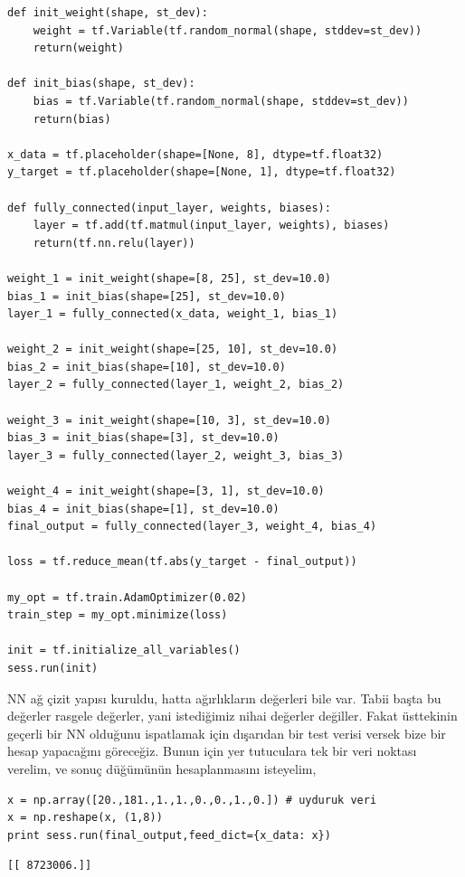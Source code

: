 \documentclass[12pt,fleqn]{article}\usepackage{../../common}
\begin{document}
\begin{verbatim}
def init_weight(shape, st_dev):
    weight = tf.Variable(tf.random_normal(shape, stddev=st_dev))
    return(weight)
    
def init_bias(shape, st_dev):
    bias = tf.Variable(tf.random_normal(shape, stddev=st_dev))
    return(bias)
    
x_data = tf.placeholder(shape=[None, 8], dtype=tf.float32)
y_target = tf.placeholder(shape=[None, 1], dtype=tf.float32)

def fully_connected(input_layer, weights, biases):
    layer = tf.add(tf.matmul(input_layer, weights), biases)
    return(tf.nn.relu(layer))

weight_1 = init_weight(shape=[8, 25], st_dev=10.0)
bias_1 = init_bias(shape=[25], st_dev=10.0)
layer_1 = fully_connected(x_data, weight_1, bias_1)

weight_2 = init_weight(shape=[25, 10], st_dev=10.0)
bias_2 = init_bias(shape=[10], st_dev=10.0)
layer_2 = fully_connected(layer_1, weight_2, bias_2)

weight_3 = init_weight(shape=[10, 3], st_dev=10.0)
bias_3 = init_bias(shape=[3], st_dev=10.0)
layer_3 = fully_connected(layer_2, weight_3, bias_3)

weight_4 = init_weight(shape=[3, 1], st_dev=10.0)
bias_4 = init_bias(shape=[1], st_dev=10.0)
final_output = fully_connected(layer_3, weight_4, bias_4)

loss = tf.reduce_mean(tf.abs(y_target - final_output))

my_opt = tf.train.AdamOptimizer(0.02)
train_step = my_opt.minimize(loss)

init = tf.initialize_all_variables()
sess.run(init)
\end{verbatim}

NN ağ çizit yapısı kuruldu, hatta ağırlıkların değerleri bile var. Tabii
başta bu değerler rasgele değerler, yani istediğimiz nihai değerler
değiller. Fakat üsttekinin geçerli bir NN olduğunu ispatlamak için
dışarıdan bir test verisi versek bize bir hesap yapacağını göreceğiz. Bunun
için yer tutuculara tek bir veri noktası verelim, ve sonuç düğümünün
hesaplanmasını isteyelim,

\begin{verbatim}
x = np.array([20.,181.,1.,1.,0.,0.,1.,0.]) # uyduruk veri
x = np.reshape(x, (1,8))
print sess.run(final_output,feed_dict={x_data: x})
\end{verbatim}

\begin{verbatim}
[[ 8723006.]]
\end{verbatim}
\end{document}
